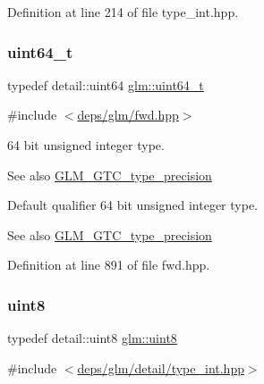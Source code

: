 Definition at line 214 of file type\+\_\+int.\+hpp.

\mbox{\label{group__gtc__type__precision_ga058f57c19e1befdcf12498944bd73e69}} 
\subsubsection{\texorpdfstring{uint64\+\_\+t}{uint64\_t}}
{\footnotesize\ttfamily typedef detail\+::uint64 \hyperlink{group__gtc__type__precision_ga058f57c19e1befdcf12498944bd73e69}{glm\+::uint64\+\_\+t}}



{\ttfamily \#include $<$\hyperlink{fwd_8hpp}{deps/glm/fwd.\+hpp}$>$}

64 bit unsigned integer type. \begin{DoxySeeAlso}{See also}
\hyperlink{group__gtc__type__precision}{G\+L\+M\+\_\+\+G\+T\+C\+\_\+type\+\_\+precision}
\end{DoxySeeAlso}
Default qualifier 64 bit unsigned integer type. \begin{DoxySeeAlso}{See also}
\hyperlink{group__gtc__type__precision}{G\+L\+M\+\_\+\+G\+T\+C\+\_\+type\+\_\+precision} 
\end{DoxySeeAlso}


Definition at line 891 of file fwd.\+hpp.

\mbox{\label{group__gtc__type__precision_ga1a7dcd8aac97cc8020817c94049deff2}} 
\subsubsection{\texorpdfstring{uint8}{uint8}}
{\footnotesize\ttfamily typedef detail\+::uint8 \hyperlink{group__gtc__type__precision_ga1a7dcd8aac97cc8020817c94049deff2}{glm\+::uint8}}



{\ttfamily \#include $<$\hyperlink{type__int_8hpp}{deps/glm/detail/type\+\_\+int.\+hpp}$>$}

